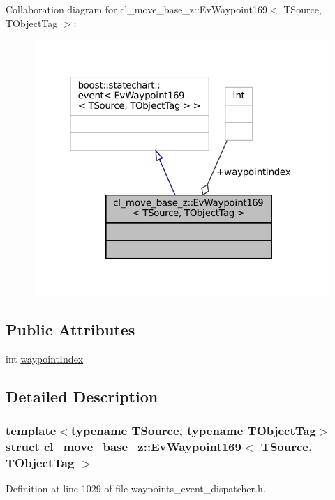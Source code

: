 Collaboration diagram for cl\+\_\+move\+\_\+base\+\_\+z\+:\+:Ev\+Waypoint169$<$ T\+Source, T\+Object\+Tag $>$\+:
\nopagebreak
\begin{figure}[H]
\begin{center}
\leavevmode
\includegraphics[width=319pt]{structcl__move__base__z_1_1EvWaypoint169__coll__graph}
\end{center}
\end{figure}
\subsection*{Public Attributes}
\begin{DoxyCompactItemize}
\item 
int \hyperlink{structcl__move__base__z_1_1EvWaypoint169_a4fdb3343d1e9a763ee1181ecd47b25f7}{waypoint\+Index}
\end{DoxyCompactItemize}


\subsection{Detailed Description}
\subsubsection*{template$<$typename T\+Source, typename T\+Object\+Tag$>$\newline
struct cl\+\_\+move\+\_\+base\+\_\+z\+::\+Ev\+Waypoint169$<$ T\+Source, T\+Object\+Tag $>$}



Definition at line 1029 of file waypoints\+\_\+event\+\_\+dispatcher.\+h.



